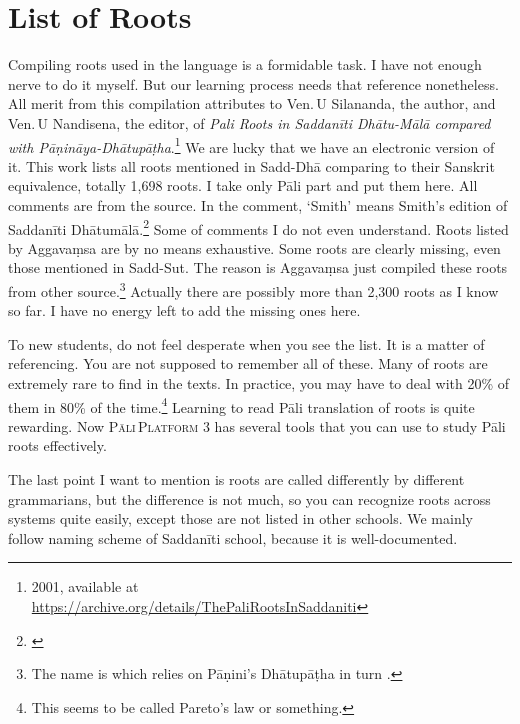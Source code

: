 \chapter{List of Roots}\label{chap:roots}

Compiling roots used in the language is a formidable task. I have not enough nerve to do it myself. But our learning process needs that reference nonetheless. All merit from this compilation attributes to Ven.\,U Silananda, the author, and Ven.\,U Nandisena, the editor, of \emph{Pali Roots in Saddan\=iti Dh\=atu-M\=al\=a compared with P\=a\d nin\=aya-Dh\=atup\=a\d tha}.\footnote{2001, available at \\\url{https://archive.org/details/ThePaliRootsInSaddaniti}} We are lucky that we have an electronic version of it. This work lists all roots mentioned in Sadd-Dh\=a comparing to their Sanskrit equivalence, totally 1,698 roots. I take only P\=ali part and put them here. All comments are from the source. In the comment, `Smith' means Smith's edition of Saddan\=iti Dh\=atum\=al\=a.\footnote{\citealp{smith:sadd2}} Some of comments I do not even understand. Roots listed by Aggava\d msa are by no means exhaustive. Some roots are clearly missing, even those mentioned in Sadd-Sut. The reason is Aggava\d msa just compiled these roots from other source.\footnote{The name is  which relies on P\=a\d nini's Dh\=atup\=a\d tha in turn \citep[pp.~56--7]{geiger:literature}.} Actually there are possibly more than 2,300 roots as I know so far. I have no energy left to add the missing ones here.

To new students, do not feel desperate when you see the list. It is a matter of referencing. You are not supposed to remember all of these. Many of roots are extremely rare to find in the texts. In practice, you may have to deal with 20\% of them in 80\% of the time.\footnote{This seems to be called Pareto's law or something.} Learning to read P\=ali translation of roots is quite rewarding. Now \textsc{P\=ali\,Platform} 3 has several tools that you can use to study P\=ali roots effectively.

The last point I want to mention is roots are called differently by different grammarians, but the difference is not much, so you can recognize roots across systems quite easily, except those are not listed in other schools. We mainly follow naming scheme of Saddan\=iti school, because it is well-documented.

